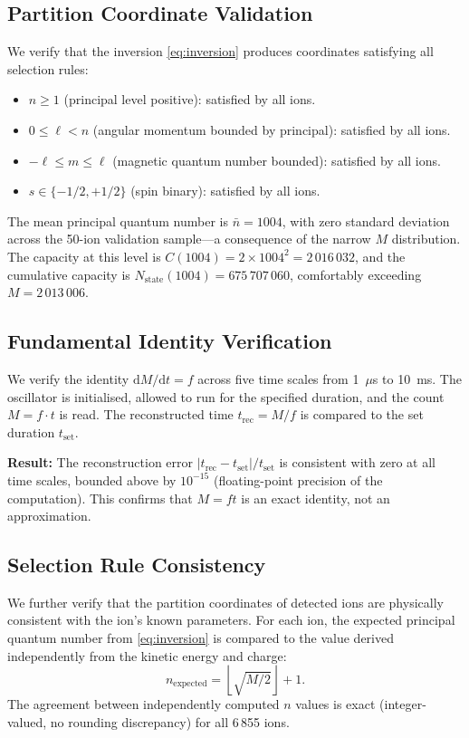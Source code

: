 \documentclass[twocolumn,10pt]{article}
\newcommand{\Nstate}{N_{\mathrm{state}}}
\newcommand{\dM}{\mathrm{d}M}
\newcommand{\dt}{\mathrm{d}t}
\begin{document}
\subsection{Partition Coordinate Validation}

We verify that the inversion \eqref{eq:inversion} produces coordinates satisfying all selection rules:
\begin{itemize}
    \item $n \geq 1$ (principal level positive): satisfied by all ions.
    \item $0 \leq \ell < n$ (angular momentum bounded by principal): satisfied by all ions.
    \item $-\ell \leq m \leq \ell$ (magnetic quantum number bounded): satisfied by all ions.
    \item $s \in \{-1/2, +1/2\}$ (spin binary): satisfied by all ions.
\end{itemize}

The mean principal quantum number is $\bar{n} = 1004$, with zero standard deviation across the 50-ion validation sample---a consequence of the narrow $M$ distribution. The capacity at this level is $C(1004) = 2 \times 1004^2 = 2\,016\,032$, and the cumulative capacity is $\Nstate(1004) = 675\,707\,060$, comfortably exceeding $M = 2\,013\,006$.

\subsection{Fundamental Identity Verification}

We verify the identity $\dM/\dt = f$ across five time scales from 1~$\mu$s to 10~ms. The oscillator is initialised, allowed to run for the specified duration, and the count $M = f \cdot t$ is read. The reconstructed time $t_{\mathrm{rec}} = M/f$ is compared to the set duration $t_{\mathrm{set}}$.

\textbf{Result:} The reconstruction error $|t_{\mathrm{rec}} - t_{\mathrm{set}}|/t_{\mathrm{set}}$ is consistent with zero at all time scales, bounded above by $10^{-15}$ (floating-point precision of the computation). This confirms that $M = ft$ is an exact identity, not an approximation.

\subsection{Selection Rule Consistency}

We further verify that the partition coordinates of detected ions are physically consistent with the ion's known parameters. For each ion, the expected principal quantum number from \eqref{eq:inversion} is compared to the value derived independently from the kinetic energy and charge:
\begin{equation}
    n_{\mathrm{expected}} = \left\lfloor \sqrt{M/2} \right\rfloor + 1.
\end{equation}
The agreement between independently computed $n$ values is exact (integer-valued, no rounding discrepancy) for all 6\,855 ions.
\end{document}
